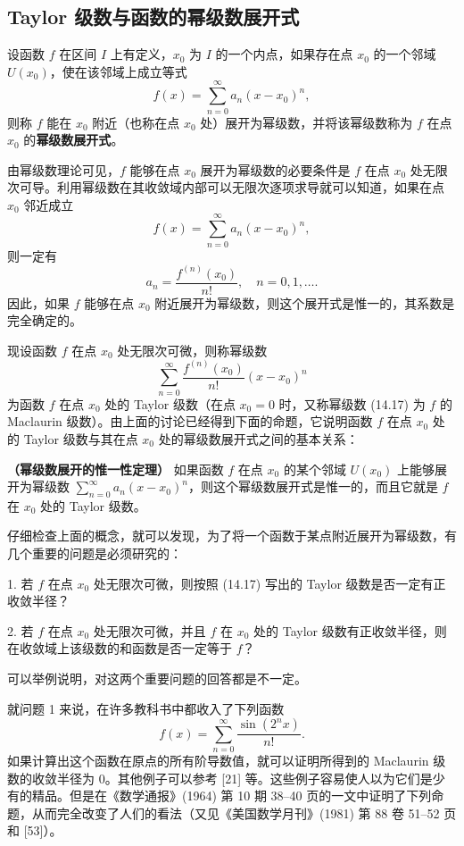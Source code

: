 \subsection{Taylor 级数与函数的幂级数展开式}

设函数 $f$ 在区间 $I$ 上有定义，$x_0$ 为 $I$ 的一个内点，如果存在点 $x_0$ 的一个邻域 $U(x_0)$，使在该邻域上成立等式
\[
  f(x)=\sum_{n=0}^{\infty}a_n(x-x_0)^n,
\]
则称 $f$ 能在 $x_0$ 附近（也称在点 $x_0$ 处）展开为幂级数，并将该幂级数称为 $f$ 在点 $x_0$ 的\textbf{幂级数展开式}。

由幂级数理论可见，$f$ 能够在点 $x_0$ 展开为幂级数的必要条件是 $f$ 在点 $x_0$ 处无限次可导。利用幂级数在其收敛域内部可以无限次逐项求导就可以知道，如果在点 $x_0$ 邻近成立
\[
  f(x)=\sum_{n=0}^{\infty}a_n(x-x_0)^n,
\]
则一定有
\[
  a_n=\frac{f^{(n)}(x_0)}{n!},\quad n=0,1,\ldots.
\]
因此，如果 $f$ 能够在点 $x_0$ 附近展开为幂级数，则这个展开式是惟一的，其系数是完全确定的。

现设函数 $f$ 在点 $x_0$ 处无限次可微，则称幂级数
\begin{equation}
  \sum_{n=0}^{\infty}\frac{f^{(n)}(x_0)}{n!}(x-x_0)^n
  \tag{14.17}
  \label{eq:14.17}
\end{equation}
为函数 $f$ 在点 $x_0$ 处的 Taylor 级数（在点 $x_0=0$ 时，又称幂级数 (14.17) 为 $f$ 的 Maclaurin 级数）。由上面的讨论已经得到下面的命题，它说明函数 $f$ 在点 $x_0$ 处的 Taylor 级数与其在点 $x_0$ 处的幂级数展开式之间的基本关系：

\begin{xproposition}[14.4.1]
\textbf{（幂级数展开的惟一性定理）} 如果函数 $f$ 在点 $x_0$ 的某个邻域 $U(x_0)$ 上能够展开为幂级数 $\displaystyle\sum_{n=0}^{\infty}a_n(x-x_0)^n$，则这个幂级数展开式是惟一的，而且它就是 $f$ 在 $x_0$ 处的 Taylor 级数。
\end{xproposition}

仔细检查上面的概念，就可以发现，为了将一个函数于某点附近展开为幂级数，有几个重要的问题是必须研究的：

1. 若 $f$ 在点 $x_0$ 处无限次可微，则按照 (14.17) 写出的 Taylor 级数是否一定有正收敛半径？

2. 若 $f$ 在点 $x_0$ 处无限次可微，并且 $f$ 在 $x_0$ 处的 Taylor 级数有正收敛半径，则在收敛域上该级数的和函数是否一定等于 $f$？

可以举例说明，对这两个重要问题的回答都是不一定。

就问题 1 来说，在许多教科书中都收入了下列函数
\begin{equation}
  f(x)=\sum_{n=0}^{\infty}\frac{\sin(2^nx)}{n!}.
  \tag{14.18}
  \label{eq:14.18}
\end{equation}
如果计算出这个函数在原点的所有阶导数值，就可以证明所得到的 Maclaurin 级数的收敛半径为 $0$。其他例子可以参考 [21] 等。这些例子容易使人以为它们是少有的精品。但是在《数学通报》(1964) 第 10 期 38--40 页的一文中证明了下列命题，从而完全改变了人们的看法（又见《美国数学月刊》(1981) 第 88 卷 51--52 页和 [53]）。

